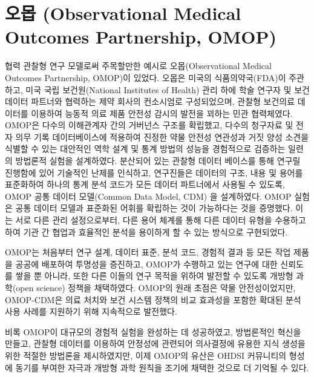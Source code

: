\documentclass[11pt]{book}
\theoremstyle{definition}
\theoremstyle{definition}
\theoremstyle{definition}
\theoremstyle{remark}
\begin{document}
\section{오몹 (Observational Medical Outcomes Partnership,
OMOP)}\label{-observational-medical-outcomes-partnership-omop}

협력 관찰형 연구 모델로써 주목할만한 예시로 오몹(Observational Medical
Outcomes Partnership, OMOP)이 있었다. 오몹은 미국의 식품의약국(FDA)이
주관하고, 미국 국립 보건원(National Institutes of Health) 관리 하에 학술
연구자 및 보건 데이터 파트너와 협력하는 제약 회사의 컨소시엄로
구성되었으며, 관찰형 보건의료 데이터를 이용하여 능동적 의료 제품 안전성
감시의 발전을 꾀하는 민관 협력체였다. \citep{stang2010omop} OMOP은
다수의 이해관계자 간의 거버넌스 구조를 확립했고, 다수의 청구자료 및 전자
의무 기록 데이터베이스에 적용하여 진정한 약물 안전성 연관성과 거짓 양성
소견을 식별할 수 있는 대안적인 역학 설계 및 통계 방법의 성능을
경험적으로 검증하는 일련의 방법론적 실험을 설계하였다. 분산되어 있는
관찰형 데이터 베이스를 통해 연구릴 진행함에 있어 기술적인 난제를
인식하고, 연구진들은 데이터의 구조, 내용 및 용어를 표준화하여 하나의
통계 분석 코드가 모든 데이터 파트너에서 사용될 수 있도록, OMOP 공통
데이터 모델(Common Data Model, CDM) 을 설계하였다.
\citep{overhage2012cdm} OMOP 실험은 공통 데이터 모델과 표준화된 어휘를
확립하는 것이 가능하다는 것을 증명했다. 이는 서로 다른 관리
설정으로부터, 다른 용어 체계를 통해 다른 데이터 유형을 수용하고 하여
기관 간 협업과 효율적인 분석을 용이하게 할 수 있는 방식으로 구현되었다.

OMOP는 처음부터 연구 설계, 데이터 표준, 분석 코드, 경험적 결과 등 모든
작업 제품을 공공에 배포하여 투명성을 증진하고, OMOP가 수행하고 있는
연구에 대한 신뢰도를 쌓을 뿐 아니라, 또한 다른 이들의 연구 목적을 위하여
발전할 수 있도록 개방형 과학(open science) 정책을 채택하였다. OMOP의
원래 초점은 약물 안전성이었지만, OMOP-CDM은 의료 처치와 보건 시스템
정책의 비교 효과성을 포함한 확대된 분석 사용 사례를 지원하기 위해
지속적으로 발전했다.

비록 OMOP이 대규모의 경험적 실험을 완성하는 데 성공하였고,
\citep{ryan2012omop, ryan2013omop} 방법론적인 혁신을 만들고,
\citep{schuemie_2014} 관찰형 데이터를 이용하여 안정성에 관련되어
의사결정에 유용한 지식 생성을 위한 적절한 방법론을 제시하였지만,
\citep{madigan_2013, madigan2013design} 이제 OMOP의 유산은 OHDSI
커뮤니티의 형성에 동기를 부여한 자극과 개방형 과학 원칙을 조기에 채택한
것으로 더 기억될 수 있다.
\end{document}
